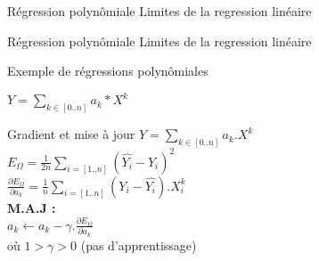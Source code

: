 
\begin{frame}{Régression polynômiale}
  Limites de la regression linéaire
\end{frame}

\begin{frame}{Régression polynômiale}
  Limites de la regression linéaire
\end{frame}

\begin{frame}{Exemple de régressions polynômiales}
  \begin{minipage}[l]{0.25\linewidth}
    $Y=\underset{k \in [0..n]}{\sum}{a_k*X^k}$
  \end{minipage}\hfill
  \begin{minipage}[c]{0.74\linewidth}
  \end{minipage}\hfill
\end{frame}

\begin{frame}{Gradient et mise à jour}
  $Y=\underset{k \in [0..n]}{\sum}{a_k.X^k}$ \\
  $\;$ \\
  $E_{\Omega} = \frac{1}{2n}\underset{i=[1..n]}{\sum}( \hat{Y_i} - Y_i )^2$ \\
  $\;$ \\
  $\frac{\partial{E_{\Omega}}}{\partial{a_k}} = \frac{1}{n}\underset{i=[1..n]}{\sum}(Y_i - \hat{Y_i}).X_i^k$ \\
  $\;$ \\
  $\;$ \\
  \textbf{M.A.J :} \\
  $\;$ \\
  $a_k \leftarrow a_k - \gamma.\frac{\partial{E_{\Omega}}}{\partial{a_k}}$ \\
  $\;$ \\
  où $1 > \gamma > 0$ (pas d'apprentissage)
\end{frame}
